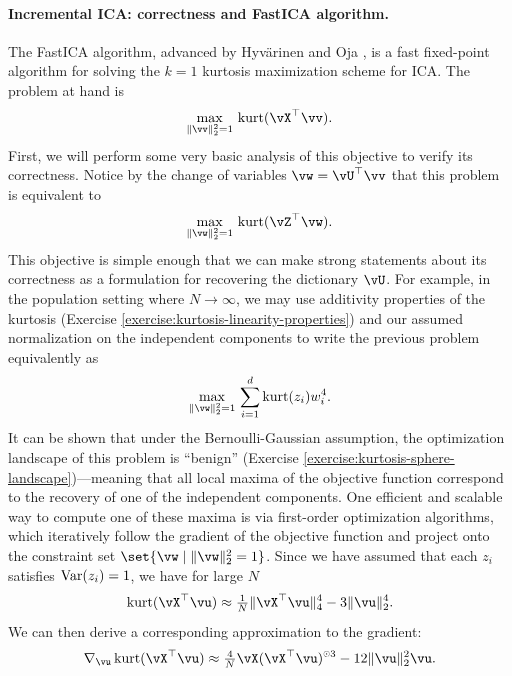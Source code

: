 \documentclass[../../book-main.tex]{subfiles}
\begin{document}
\paragraph{Incremental ICA: correctness and FastICA algorithm.}
The FastICA algorithm, advanced by Hyv\"{a}rinen and Oja \cite{hyvarinen-1997}, is a fast fixed-point algorithm for solving the $k=1$ kurtosis maximization scheme for ICA.
The problem at hand is
\begin{equation}\label{eq:kurtosis-maximization-sphere-finitesample}
    \max_{\norm{\vv}_2^2 = 1}\, \kurt(\vX^\top \vv).
\end{equation}
First, we will perform some very basic analysis of this objective to verify its correctness. Notice by the change of variables $\vw = \vU^\top \vv$ that this problem is equivalent to
\begin{equation*}
    \max_{\norm{\vw}_2^2 = 1}\, 
    \mathrm{kurt}(\vZ^\top \vw).
\end{equation*}
This objective is simple enough that we can make strong statements about its correctness as a formulation for recovering the dictionary $\vU$.
For example, in the population setting where $N \to \infty$, 
we may use additivity properties of the kurtosis (Exercise \ref{exercise:kurtosis-linearity-properties}) and our assumed normalization on the independent components to write the previous problem equivalently as
\begin{equation}\label{eq:kurtosis-maximization-sphere-population-simple}
    \max_{\norm{\vw}_2^2 = 1}\, 
    \sum_{i=1}^d \mathrm{kurt}(z_i) w_i^4.
\end{equation}
It can be shown that under the Bernoulli-Gaussian assumption, the optimization landscape of this problem is ``benign'' (Exercise \ref{exercise:kurtosis-sphere-landscape})---meaning that all local maxima of the objective function correspond to the recovery of one of the independent components.
One efficient and scalable way to compute one of these maxima is via first-order optimization algorithms, which iteratively follow the gradient of the objective function and project onto the constraint set $\set{\vw \given \norm{\vw}_2^2 = 1}$.
Since we have assumed that each $z_i$ satisfies $\operatorname{Var}(z_i)=1$, we 
have for large $N$
\begin{equation}\label{eq:kurtosis-approximation-l4}
    \kurt(\vX^\top \vu)
    \approx
    \tfrac{1}{N} \norm{\vX^\top \vu}_4^4 - 3 \norm{\vu}_2^4.
\end{equation}
We can then derive a corresponding approximation to the gradient:
\begin{equation*}
    \nabla_{\vu} \kurt(\vX^\top \vu)
    \approx
    \tfrac{4}{N} \vX (\vX^\top \vu)^{\hada 3}
    - 12 \norm{\vu}_2^2 \vu.
\end{equation*}
\end{document}
